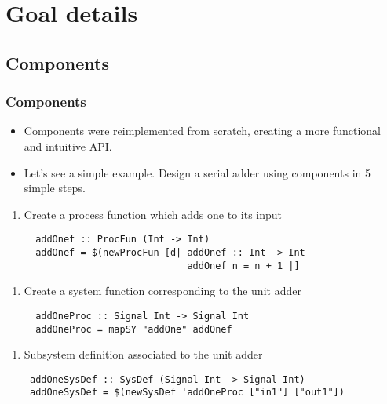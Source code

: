 \documentclass{beamer}
\begin{document}
\section{Goal details}

\subsection{Components}

\begin{frame}[fragile]
  \frametitle{Components}
  \begin{itemize}
  \item
  Components were reimplemented from scratch, creating a more functional and intuitive API.
  \item
  Let's see a simple example. Design a serial adder using components in 5 simple steps.
  \end{itemize}
  
  
  \vspace{-0.7cm}
  \begin{overprint}
   \begin{enumerate}[1)]
   \item Create a process function which adds one to its input 
    \begin{lstlisting}
  addOnef :: ProcFun (Int -> Int)
  addOnef = $(newProcFun [d| addOnef :: Int -> Int 
                             addOnef n = n + 1 |]
    \end{lstlisting}
    \end{enumerate}
   
   \begin{enumerate}[2)]
   \item Create a system function corresponding to the unit adder
   \begin{lstlisting}
  addOneProc :: Signal Int -> Signal Int
  addOneProc = mapSY "addOne" addOnef
   \end{lstlisting}
   \end{enumerate}
   
   \begin{enumerate}[3)]
   \item Subsystem definition associated to the unit adder
   \begin{lstlisting}
 addOneSysDef :: SysDef (Signal Int -> Signal Int)
 addOneSysDef = $(newSysDef 'addOneProc ["in1"] ["out1"])
   \end{lstlisting}
   \end{enumerate}



\end{overprint}
\end{frame}
\end{document}
